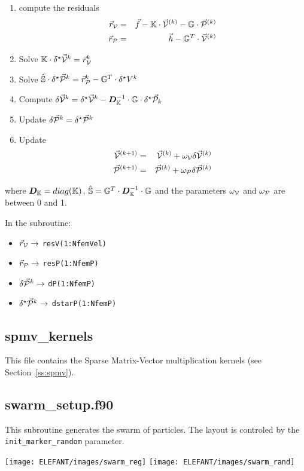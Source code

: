  \begin{enumerate}
 \item compute the residuals 
 \begin{eqnarray}
 \vec{r}_{\cal V} &=& \vec{f} - {\mathbb{K}} \cdot \vec{\cal V}^{(k)} - {\mathbb{G}} \cdot \vec{\cal P}^{(k)} \nonumber\\
 \vec{r}_{\cal P} &=& \vec{h} - {\mathbb{G}}^T \cdot \vec{\cal V}^{(k)} \nonumber
 \end{eqnarray}
 \item Solve ${\mathbb{K}}  \cdot \delta^\star \vec{\cal V}^k =  \vec{r}_{\cal V}^k  $
 \item Solve $\hat{{\mathbb{S}}}\cdot\delta^\star\vec{\cal P}^k =\vec{r}_{\cal P}^k-{\mathbb{G}}^T\cdot\delta^\star V^k $
 \item Compute $\delta \vec{\cal V}^k = \delta^\star \vec{\cal V}^k -{\bm D}_{\mathbb{K}}^{-1} \cdot {\mathbb{G}} \cdot \delta^\star \vec{\cal P}_k $
 \item Update $\delta \vec{\cal P}^k = \delta^\star \vec{\cal P}^k$
 \item Update 
 \begin{eqnarray}
 \vec{\cal V}^{(k+1)} &=& \vec{\cal V}^{(k)} + \omega_{\cal V} \delta \vec{\cal V}^{(k)} \nonumber\\
 \vec{\cal P}^{(k+1)} &=& \vec{\cal P}^{(k)} + \omega_{\cal P} \delta \vec{\cal P}^{(k)} \nonumber
 \end{eqnarray}
 \end{enumerate}
 where ${\bm D}_{\mathbb{K}}=diag({\mathbb{K}})$, $\hat{{\mathbb{S}}} = {\mathbb{G}}^T \cdot {\bm D}_{\mathbb{K}}^{-1} \cdot {\mathbb{G}}$ 
 and the parameters $\omega_{\cal V}$ and 
 $\omega_{\cal P}$ are between 0 and 1.

 In the subroutine:
 \begin{itemize}
 \item $\vec{r}_{\cal V} \rightarrow$ {\tt resV(1:NfemVel)}
 \item $\vec{r}_{\cal P} \rightarrow$ {\tt resP(1:NfemP)}
 \item $\delta \vec{\cal P}^k \rightarrow$ {\tt dP(1:NfemP)}
 \item $\delta^\star \vec{\cal P}^k \rightarrow$ {\tt dstarP(1:NfemP)}
 \end{itemize}
 \subsection{spmv\_kernels}
 This file contains the Sparse Matrix-Vector multiplication kernels (see Section~\ref{ss:spmv}).
 \subsection{swarm\_setup.f90}
 This subroutine generates the swarm of particles. The layout is controled 
 by the {\tt init\_marker\_random} parameter.
 \begin{center}
 \texttt{[image: ELEFANT/images/swarm\_reg]} 
 \texttt{[image: ELEFANT/images/swarm\_rand]} 
 \end{center}

